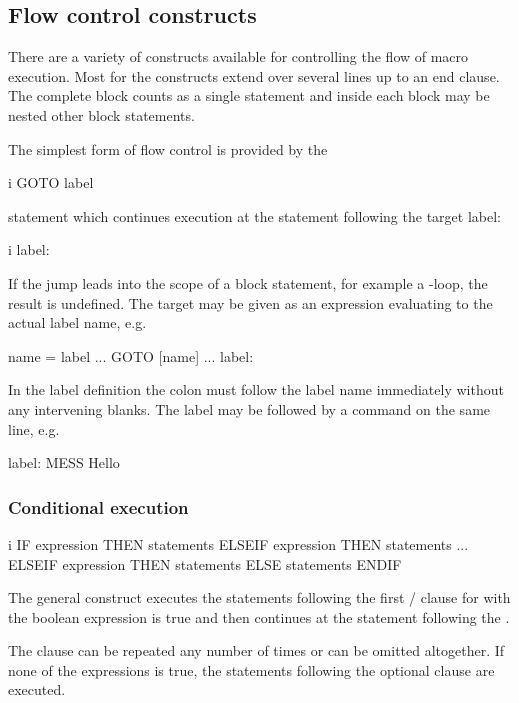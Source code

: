 \subsection{Flow control constructs}
 
There are  a variety of constructs
available for controlling the flow of macro execution.
Most for the constructs extend over several lines up to an end clause.
The complete block counts as a single statement and inside each block
may be nested other block statements. 

The simplest form of flow control is provided by the 
\begin{Gray}{i}
GOTO label
\end{Gray}
statement which continues execution at the statement following the
target label:
\begin{Gray}{i}
label:
\end{Gray}
If the jump leads into the scope of a block statement, for example a
-loop, the result is undefined.
The target may be given as an expression evaluating to the actual
label name, e.g.\ 
\begin{XMP}
name = label
  ...
GOTO [name]
  ...
label:
\end{XMP}

In the label definition the colon must follow the label name
immediately without any intervening blanks.
The label may be followed by a command on the same line, e.g.\
\begin{XMP}
label: MESS Hello
\end{XMP}

\condbreak{5cm}
\subsubsection{Conditional execution}

\begin{Gray}{i}
IF expression THEN
   statements
ELSEIF expression THEN
   statements
...
ELSEIF expression THEN
   statements
ELSE
   statements
ENDIF
\end{Gray}
The general  construct executes the statements following the
first / clause for with the boolean expression is
true and then continues at the statement following the \Lit{ENDIF}.

The \Lit{ELSEIF} clause can be repeated any number of times or can be
omitted altogether.
If none of the expressions is true, the statements following the
optional \Lit{ELSE} clause are executed.
 

